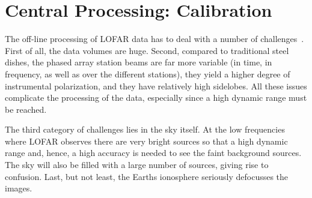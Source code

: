 \documentclass[journal]{IEEEtran}
\begin{document}


\section{Central Processing: Calibration}

The off-line processing of LOFAR data has to deal with a number of challenges~\cite{Noordam:04,Nijboer:07}. First of all, the data volumes are huge. Second, compared to traditional steel dishes, the phased array station beams are far more variable (in time, in frequency, as well as over the different stations), they yield a higher degree of instrumental polarization, and they have relatively high sidelobes. All these issues complicate the processing of the data, especially since a high dynamic range must be reached. 

The third category of challenges lies in the sky itself. At the low frequencies where LOFAR observes there are very bright sources so that a high dynamic range and, hence, a high accuracy is needed to see the faint background sources. The sky will also be filled with a large number of sources, giving rise to confusion. Last, but not least, the Earths ionosphere seriously defocusses the images.
\end{document}
